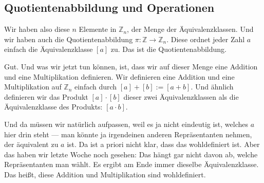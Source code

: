 \begin{math-stroke}

\end{math-stroke}

\subsection{Quotientenabbildung und Operationen}

\begin{spoken-clean}[00:05:31 - 00:07:36]
Wir haben also diese $n$ Elemente in $\mathbb{Z}_n$, der Menge der Äquivalenzklassen. Und wir haben auch die Quotientenabbildung $\pi \colon \mathbb{Z} \to \mathbb{Z}_n$. Diese ordnet jeder Zahl $a$ einfach die Äquivalenzklasse $[a]$ zu. Das ist die Quotientenabbildung.

Gut. Und was wir jetzt tun können, ist, dass wir auf dieser Menge eine Addition und eine Multiplikation definieren. Wir definieren eine Addition und eine Multiplikation auf $\mathbb{Z}_n$ einfach durch $[a] + [b] := [a + b]$. Und ähnlich definieren wir das Produkt $[a] \cdot [b]$ dieser zwei Äquivalenzklassen als die Äquivalenzklasse des Produkts: $[a \cdot b]$.

Und da müssen wir natürlich aufpassen, weil es ja nicht eindeutig ist, welches $a$ hier drin steht --- man könnte ja irgendeinen anderen Repräsentanten nehmen, der äquivalent zu $a$ ist. Da ist a priori nicht klar, dass das wohldefiniert ist. Aber das haben wir letzte Woche noch gesehen: Das hängt gar nicht davon ab, welche Repräsentanten man wählt. Es ergibt am Ende immer dieselbe Äquivalenzklasse. Das heißt, diese Addition und Multiplikation sind wohldefiniert.
\end{spoken-clean}

